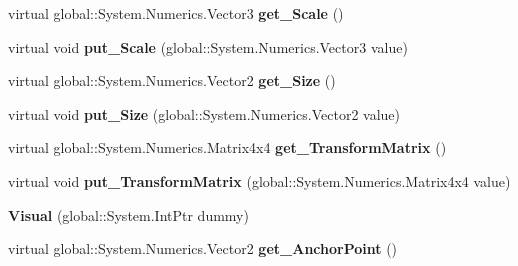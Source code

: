 \begin{DoxyCompactItemize}
\mbox{\label{class_windows_1_1_u_i_1_1_composition_1_1_visual_a35b342e278a4e2eee8f7e447d88c1043}} 
virtual global\+::\+System.\+Numerics.\+Vector3 {\bfseries get\+\_\+\+Scale} ()
\item 
\mbox{\label{class_windows_1_1_u_i_1_1_composition_1_1_visual_a7d09090c17f01920bb97e02f119cc78f}} 
virtual void {\bfseries put\+\_\+\+Scale} (global\+::\+System.\+Numerics.\+Vector3 value)
\item 
\mbox{\label{class_windows_1_1_u_i_1_1_composition_1_1_visual_aac55aa21f6e472aab4a33831d9e4ea2a}} 
virtual global\+::\+System.\+Numerics.\+Vector2 {\bfseries get\+\_\+\+Size} ()
\item 
\mbox{\label{class_windows_1_1_u_i_1_1_composition_1_1_visual_a00b77bc75500670531a48399d03ffe1d}} 
virtual void {\bfseries put\+\_\+\+Size} (global\+::\+System.\+Numerics.\+Vector2 value)
\item 
\mbox{\label{class_windows_1_1_u_i_1_1_composition_1_1_visual_a8c23adab99bc95b5ccbf93a75ed76265}} 
virtual global\+::\+System.\+Numerics.\+Matrix4x4 {\bfseries get\+\_\+\+Transform\+Matrix} ()
\item 
\mbox{\label{class_windows_1_1_u_i_1_1_composition_1_1_visual_a2689ab7c32a3c7a5d1978aa89a514762}} 
virtual void {\bfseries put\+\_\+\+Transform\+Matrix} (global\+::\+System.\+Numerics.\+Matrix4x4 value)
\item 
\mbox{\label{class_windows_1_1_u_i_1_1_composition_1_1_visual_ae752ab49085c6766890dc632d053d6e8}} 
{\bfseries Visual} (global\+::\+System.\+Int\+Ptr dummy)
\item 
\mbox{\label{class_windows_1_1_u_i_1_1_composition_1_1_visual_a5c51998e94ec1776d9b212fef7f643c6}} 
virtual global\+::\+System.\+Numerics.\+Vector2 {\bfseries get\+\_\+\+Anchor\+Point} ()
\item 

\end{DoxyCompactItemize}
